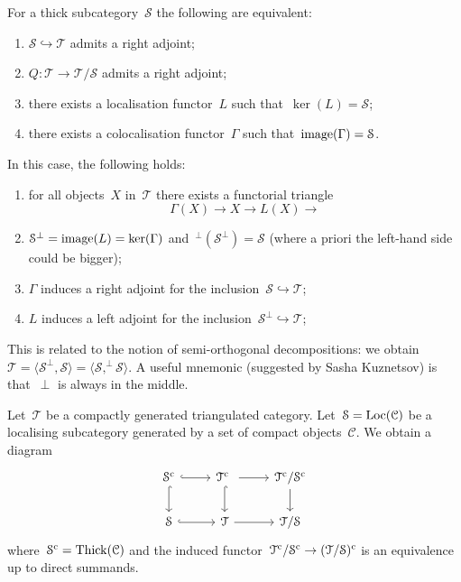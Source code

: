 \documentclass[10pt,a4paper]{article}
\begin{document}
\begin{proposition}
  For a thick subcategory~$\mathcal{S}$ the following are equivalent:
  \begin{enumerate}
    \item $\mathcal{S}\hookrightarrow\mathcal{T}$ admits a right adjoint;
    \item $Q\colon\mathcal{T}\to\mathcal{T}/\mathcal{S}$ admits a right adjoint;%
    \item there exists a localisation functor~$L$ such that~$\ker(L)=\mathcal{S}$;
    \item there exists a colocalisation functor~$\Gamma$ such that~$\operatorname{image}(\Gamma)=\mathcal{S}$.
  \end{enumerate}
\end{proposition}
In this case, the following holds:
\begin{enumerate}
  \item for all objects~$X$ in~$\mathcal{T}$ there exists a functorial triangle
    \begin{equation}
      \Gamma(X)\to X\to L(X)\to
    \end{equation}
  \item $\mathcal{S}^\perp=\operatorname{image}(L)=\ker(\Gamma)$ and~${}^\perp(\mathcal{S}^\perp)=\mathcal{S}$ (where a priori the left-hand side could be bigger);
  \item $\Gamma$ induces a right adjoint for the inclusion~$\mathcal{S}\hookrightarrow\mathcal{T}$;
  \item $L$ induces a left adjoint for the inclusion~$\mathcal{S}^\perp\hookrightarrow\mathcal{T}$;
\end{enumerate}
\begin{remark}
  This is related to the notion of semi-orthogonal decompositions: we obtain~$\mathcal{T}=\langle\mathcal{S}^\perp,\mathcal{S}\rangle=\langle\mathcal{S},^\perp\mathcal{S}\rangle$. A useful mnemonic (suggested by Sasha Kuznetsov) is that~$\perp$ is always in the middle.
\end{remark}
\begin{example}
  Let~$\mathcal{T}$ be a compactly generated triangulated category. Let~$\mathcal{S}=\operatorname{Loc}(\mathcal{C})$ be a localising subcategory generated by a set of compact objects~$\mathcal{C}$. We obtain a diagram%
  \begin{equation}
    \begin{tikzcd}
      \mathcal{S}^\cc \arrow[hook]{r} \arrow[hook]{d} & \mathcal{T}^\cc \arrow{r} \arrow[hook]{d} & \mathcal{T}^\cc/\mathcal{S}^\cc \arrow{d} \\
      \mathcal{S} \arrow[hook]{r} & \mathcal{T} \arrow{r} & \mathcal{T}/\mathcal{S}
    \end{tikzcd}
  \end{equation}
  where~$\mathcal{S}^{\mathrm{c}}=\operatorname{Thick}(\mathcal{C})$ and the induced functor~$\mathcal{T}^{\mathrm{c}}/\mathcal{S}^{\mathrm{c}}\to(\mathcal{T}/\mathcal{S})^{\mathrm{c}}$ is an equivalence up to direct summands.
\end{example}
\end{document}
